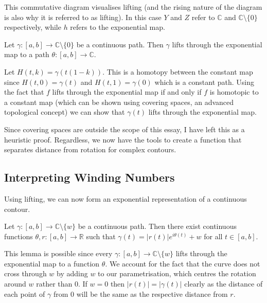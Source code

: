 \documentclass[a4paper]{article}
\newenvironment{hproof}{%
  \renewcommand{\proofname}{Heuristic Proof}\proof}{\endproof}
\begin{document}
This commutative diagram visualises lifting (and the rising nature of the diagram is also why it is referred to as lifting). In this case $Y$ and $Z$ refer to $\mathbb{C}$ and $\mathbb{C}\setminus \{0\}$ respectively, while $h$ refers to the exponential map.  

\begin{proposition}{\citep[p.29]{Roe}}{}
Let $\gamma :[a,b] \rightarrow \mathbb{C}\setminus\{0\}$ be a continuous path. Then $\gamma$ lifts through the exponential map to a path $\theta: [a,b] \rightarrow \mathbb{C}$.

\end{proposition}

\begin{hproof}
Let $H(t,k) = \gamma (t(1-k))$. This is a homotopy between the constant map since $H(t,0) = \gamma (t)$ and $H(t,1) = \gamma (0)$ which is a constant path. Using the fact that $f$ lifts through the exponential map if and only if $f$ is homotopic to a constant map (which can be shown using covering spaces, an advanced topological concept) we can show that $\gamma(t)$ lifts through the exponential map.
\end{hproof}

Since covering spaces are outside the scope of this essay, I have left this as a heuristic proof. Regardless, we now have the tools to create a function that separates distance from rotation for complex contours.

\newpage

\subsection{Interpreting Winding Numbers}

Using lifting, we can now form an exponential representation of a continuous contour.

\begin{lemma}{\citep[p.29]{Roe}}{} \label{thm:lifted}
Let $\gamma :[a,b] \rightarrow \mathbb{C}\setminus\{w\}$ be a continuous path. Then there exist continuous functions $\theta, r: [a,b] \rightarrow \mathbb{R}$ such that $\gamma(t) = |r(t)|e^{i\theta(t)} + w$ for all $ t \in [a,b]$.

\end{lemma}

This lemma is possible since every $\gamma : [a,b] \rightarrow \mathbb{C}\setminus\{w\}$ lifts through the exponential map to a function $\theta$. We account for the fact that the curve does not cross through $w$ by adding $w$ to our parametrisation, which centres the rotation around $w$ rather than $0$. If $w=0$ then $|r(t)| = |\gamma(t)|$ clearly as the distance of each point of $\gamma$ from $0$ will be the same as the respective distance from $r$. 
\end{document}

